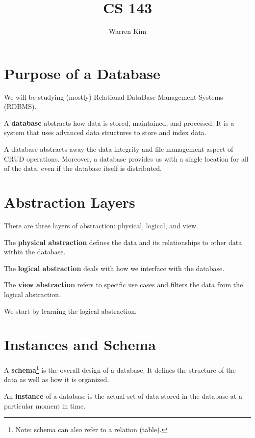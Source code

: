 \documentclass{report}
\title{CS 143}
\author{Warren Kim}
\date{}
\newenvironment{definition}[1]{\begin{tcolorbox}[title={Definition: #1}]}{\end{tcolorbox}}
\renewcommand{\bf}[1]{\textbf{{#1}}}
\begin{document}
\maketitle

\tableofcontents
\newpage

\section{Purpose of a Database}
We will be studying (mostly) Relational DataBase Management Systems (RDBMS).
\begin{definition}{Database}
    A \bf{database} abstracts how data is stored, maintained, and processed. It is a system that uses
    advanced data structures to store and index data.
\end{definition}
A database abstracts away the data integrity and file management aspect of CRUD operations. Moreover,
a database provides us with a single location for all of the data, even if the database itself is
distributed.





\section{Abstraction Layers}
There are three layers of abstraction: physical, logical, and view. 
\begin{definition}{Physical Abstraction}
    The \bf{physical abstraction} defines the data and its relationships to other data within the 
    database.
\end{definition}
\begin{definition}{Logical Abstraction}
    The \bf{logical abstraction} deals with how we interface with the database.
\end{definition}
\begin{definition}{View Abstraction}
    The \bf{view abstraction} refers to specific use cases and filters the data from the logical
    abstraction.
\end{definition}
We start by learning the logical abstraction.





\section{Instances and Schema}
\begin{definition}{Schema and Instance}
    A \bf{schema}\footnote{Note: schema can also refer to a relation (table).} is the overall design 
    of a database. It defines the structure of the data as well as how it is organized. \vspace{10pt}

    An \bf{instance} of a database is the actual set of data stored in the database at a particular 
    moment in time. 
\end{definition}
\end{document}
